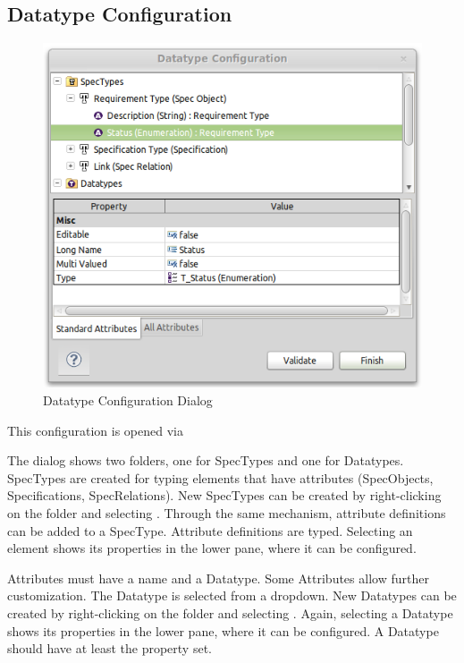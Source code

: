 \subsection{Datatype Configuration}
\label{sec:datatype_configuration}

\begin{figure}
\centering     
\includegraphics[width=0.8\linewidth]{../rmf-images/pror_datatype_configuration.png}
\caption{Datatype Configuration Dialog}      
\label{fig:DatatypeConfig}
\end{figure}

This configuration is opened via 

The dialog shows two folders, one for SpecTypes and one for Datatypes.
SpecTypes are created for typing elements that have attributes
(SpecObjects, Specifications, SpecRelations).  New SpecTypes can be
created by right-clicking on the folder and selecting .
Through the same mechanism, attribute definitions can be added to a
SpecType.  Attribute definitions are typed.  Selecting an element shows
its properties in the lower pane, where it can be configured.

Attributes must have a name and a Datatype.  Some Attributes
allow further customization.  The Datatype is selected from a
dropdown.  New Datatypes can be created by right-clicking on the folder
 and selecting .  Again, selecting a Datatype
shows its properties in the lower pane, where it can be configured.  A
Datatype should have at least the  property set.

